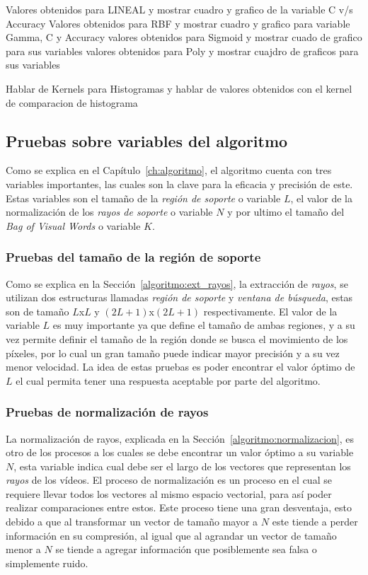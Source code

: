 Valores obtenidos para LINEAL y mostrar cuadro y grafico de la variable C v/s Accuracy
Valores obtenidos para RBF y mostrar cuadro y grafico para variable Gamma, C y Accuracy
valores obtenidos para Sigmoid y mostrar cuado de grafico para sus variables
valores obtenidos para Poly y mostrar cuajdro de graficos para sus variables

Hablar de Kernels para Histogramas y hablar de valores obtenidos con el kernel de comparacion de histograma


\subsection{Pruebas sobre variables del algoritmo}
\label{exp:var}
Como se explica en el Capítulo~\ref{ch:algoritmo}, el algoritmo cuenta con tres variables importantes, las cuales son la clave para la eficacia y precisión de este. Estas variables son el tamaño de la \textit{región de soporte} o variable $L$, el valor de la normalización de los \textit{rayos de soporte} o variable $N$ y por ultimo el tamaño del \textit{Bag of Visual Words} o variable $K$.

\subsubsection{Pruebas del tamaño de la región de soporte}
Como se explica en la Sección~\ref{algoritmo:ext_rayos}, la extracción de \textit{rayos}, se utilizan dos estructuras llamadas \textit{región de soporte} y \textit{ventana de búsqueda}, estas son de tamaño $L$x$L$ y $(2L+1)$x$(2L+1)$ respectivamente. El valor de la variable $L$ es muy importante ya que define el tamaño de ambas regiones, y a su vez permite definir el tamaño de la región donde se busca el movimiento de los píxeles, por lo cual un gran tamaño puede indicar mayor precisión y a su vez menor velocidad. La idea de estas pruebas es poder encontrar el valor óptimo de $L$ el cual permita tener una respuesta aceptable por parte del algoritmo. 

\subsubsection{Pruebas de normalización de rayos}	

La normalización de rayos, explicada en la Sección~\ref{algoritmo:normalizacion}, es otro de los procesos a los cuales se debe encontrar un valor óptimo a su variable $N$, esta variable indica cual debe ser el largo de los vectores que representan los \textit{rayos} de los vídeos. El proceso de normalización es un proceso en el cual se requiere llevar todos los vectores al mismo espacio vectorial, para así poder realizar comparaciones entre estos. Este proceso tiene una gran desventaja, esto debido a que al transformar un vector de tamaño mayor a $N$ este tiende a perder información en su compresión, al igual que al agrandar un vector de tamaño menor a $N$ se tiende a agregar información que posiblemente sea falsa o simplemente ruido.

